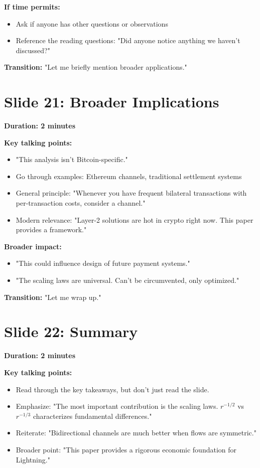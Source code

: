 \documentclass[11pt]{article}
\begin{document}
\textbf{If time permits:}
\begin{itemize}
    \item Ask if anyone has other questions or observations
    \item Reference the reading questions: "Did anyone notice anything we haven't discussed?"
\end{itemize}

\textbf{Transition:} "Let me briefly mention broader applications."

\section*{Slide 21: Broader Implications}

\textbf{Duration: 2 minutes}

\textbf{Key talking points:}
\begin{itemize}
    \item "This analysis isn't Bitcoin-specific."
    \item Go through examples: Ethereum channels, traditional settlement systems
    \item General principle: "Whenever you have frequent bilateral transactions with per-transaction costs, consider a channel."
    \item Modern relevance: "Layer-2 solutions are hot in crypto right now. This paper provides a framework."
\end{itemize}

\textbf{Broader impact:}
\begin{itemize}
    \item "This could influence design of future payment systems."
    \item "The scaling laws are universal. Can't be circumvented, only optimized."
\end{itemize}

\textbf{Transition:} "Let me wrap up."

\section*{Slide 22: Summary}

\textbf{Duration: 2 minutes}

\textbf{Key talking points:}
\begin{itemize}
    \item Read through the key takeaways, but don't just read the slide.
    \item Emphasize: "The most important contribution is the scaling laws. $r^{-1/2}$ vs $r^{-1/3}$ characterizes fundamental differences."
    \item Reiterate: "Bidirectional channels are much better when flows are symmetric."
    \item Broader point: "This paper provides a rigorous economic foundation for Lightning."
\end{itemize}
\end{document}
